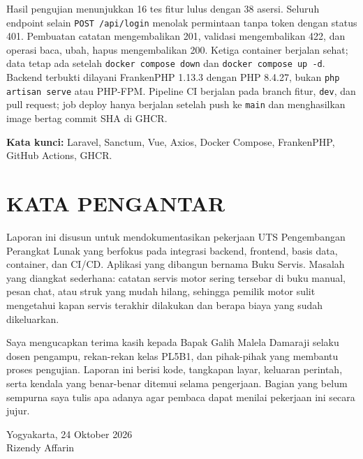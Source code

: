\documentclass[12pt,a4paper,oneside]{book}
\begin{document}
Hasil pengujian menunjukkan 16 tes fitur lulus dengan 38 asersi. Seluruh endpoint
selain \texttt{POST /api/login} menolak permintaan tanpa token dengan status 401.
Pembuatan catatan mengembalikan 201, validasi mengembalikan 422, dan operasi baca,
ubah, hapus mengembalikan 200. Ketiga container berjalan sehat; data tetap ada
setelah \texttt{docker compose down} dan \texttt{docker compose up -d}. Backend
terbukti dilayani FrankenPHP 1.13.3 dengan PHP 8.4.27, bukan \texttt{php artisan serve}
atau PHP-FPM. Pipeline CI berjalan pada branch fitur, \texttt{dev}, dan pull request;
job deploy hanya berjalan setelah push ke \texttt{main} dan menghasilkan image
bertag commit SHA di GHCR.

\vspace{0.4cm}
\noindent\textbf{Kata kunci:} Laravel, Sanctum, Vue, Axios, Docker Compose,
FrankenPHP, GitHub Actions, GHCR.

\chapter*{KATA PENGANTAR}

Laporan ini disusun untuk mendokumentasikan pekerjaan UTS Pengembangan Perangkat
Lunak yang berfokus pada integrasi backend, frontend, basis data, container, dan
CI/CD. Aplikasi yang dibangun bernama Buku Servis. Masalah yang diangkat sederhana:
catatan servis motor sering tersebar di buku manual, pesan chat, atau struk yang
mudah hilang, sehingga pemilik motor sulit mengetahui kapan servis terakhir dilakukan
dan berapa biaya yang sudah dikeluarkan.

Saya mengucapkan terima kasih kepada Bapak Galih Malela Damaraji selaku dosen
pengampu, rekan-rekan kelas PL5B1, dan pihak-pihak yang membantu proses pengujian.
Laporan ini berisi kode, tangkapan layar, keluaran perintah, serta kendala yang
benar-benar ditemui selama pengerjaan. Bagian yang belum sempurna saya tulis apa
adanya agar pembaca dapat menilai pekerjaan ini secara jujur.

\vspace{0.6cm}
\begin{flushright}
  Yogyakarta, 24 Oktober 2026\\[1.2cm]
  Rizendy Affarin
\end{flushright}

\begingroup
\singlespacing
\tableofcontents
\listoffigures
\listoftables
\lstlistoflistings
\endgroup

\mainmatter
\pagestyle{fancy}
\end{document}
